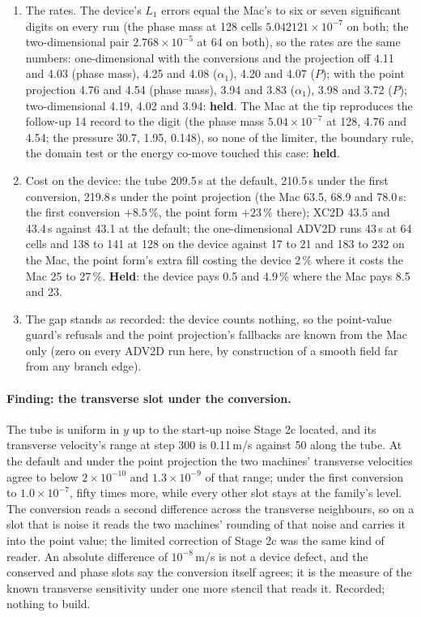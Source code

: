 \documentclass[11pt,a4paper]{article}
\begin{document}
\begin{enumerate}[nosep]
      absolute figures are the ones that mean anything on a uniform
      field.
\item The rates.  The device's $L_1$ errors equal the Mac's to six or
      seven significant digits on every run (the phase mass at 128
      cells $5.042121\times10^{-7}$ on both; the two-dimensional pair
      $2.768\times10^{-5}$ at 64 on both), so the rates are the same
      numbers: one-dimensional with the conversions and the projection
      off 4.11 and 4.03 (phase mass), 4.25 and 4.08 ($\alpha_1$), 4.20
      and 4.07 ($P$); with the point projection 4.76 and 4.54 (phase
      mass), 3.94 and 3.83 ($\alpha_1$), 3.98 and 3.72 ($P$);
      two-dimensional 4.19, 4.02 and 3.94: \textbf{held}.  The Mac at
      the tip reproduces the follow-up 14 record to the digit (the
      phase mass $5.04\times10^{-7}$ at 128, 4.76 and 4.54; the pressure
      30.7, 1.95, 0.148), so none of the limiter, the boundary rule,
      the domain test or the energy co-move touched this case:
      \textbf{held}.
\item Cost on the device: the tube 209.5\,s at the default, 210.5\,s
      under the first conversion, 219.8\,s under the point projection
      (the Mac 63.5, 68.9 and 78.0\,s: the first conversion $+8.5\,\%$,
      the point form $+23\,\%$ there); XC2D 43.5 and 43.4\,s against 43.1
      at the default; the one-dimensional ADV2D runs 43\,s at 64 cells
      and 138 to 141 at 128 on the device against 17 to 21 and 183 to
      232 on the Mac, the point form's extra fill costing the device
      2\,\% where it costs the Mac 25 to 27\,\%.  \textbf{Held}: the device pays 0.5 and 4.9\,\% where the Mac pays 8.5 and 23.
\item The gap stands as recorded: the device counts nothing, so the
      point-value guard's refusals and the point projection's fallbacks
      are known from the Mac only (zero on every ADV2D run here, by
      construction of a smooth field far from any branch edge).
\end{enumerate}

\paragraph{Finding: the transverse slot under the conversion.}  The
tube is uniform in $y$ up to the start-up noise Stage 2c located, and
its transverse velocity's range at step 300 is 0.11\,m/s against 50
along the tube.  At the default and under the point projection the two
machines' transverse velocities agree to below $2\times10^{-10}$ and
$1.3\times10^{-9}$ of that range; under the first conversion to
$1.0\times10^{-7}$, fifty times more, while every other slot stays at
the family's level.  The conversion reads a second difference across
the transverse neighbours, so on a slot that is noise it reads the two
machines' rounding of that noise and carries it into the point value;
the limited correction of Stage 2c was the same kind of reader.  An
absolute difference of $10^{-8}$\,m/s is not a device defect, and the
conserved and phase slots say the conversion itself agrees; it is the
measure of the known transverse sensitivity under one more stencil
that reads it.  Recorded; nothing to build.
\end{document}

